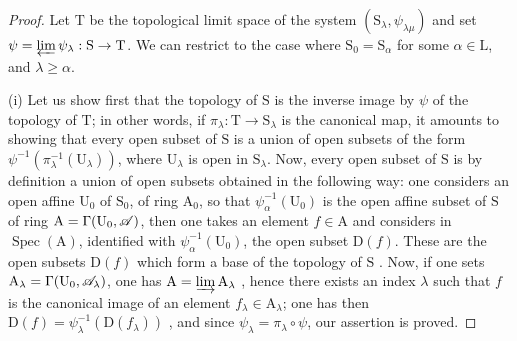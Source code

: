 \begin{proof}
Let $\mathrm{T}$ be the topological limit space of the system $(\mathrm{S}_\lambda,\psi_{\lambda\mu})$ and set $\psi=\varprojlim\psi_\lambda:\mathrm{S}\to\mathrm{T}$.
We can restrict to the case where $\mathrm{S}_0=\mathrm{S}_\alpha$ for some $\alpha\in\mathrm{L}$, and $\lambda\geqslant\alpha$.

\medskip
\noindent
(i) Let us show first that the topology of $\mathrm{S}$ is the inverse image by $\psi$ of the topology of $\mathrm{T}$; in other words, if $\pi_\lambda:\mathrm{T}\to\mathrm{S}_\lambda$ is the canonical map, it amounts to showing that every open subset of $\mathrm{S}$ is a union of open subsets of the form $\psi^{-1}(\pi_\lambda^{-1}(\mathrm{U}_\lambda))$, where $\mathrm{U}_\lambda$ is open in $\mathrm{S}_\lambda$.
Now, every open subset of $\mathrm{S}$ is by definition a union of open subsets obtained in the following way: one considers an open affine $\mathrm{U}_0$ of $\mathrm{S}_0$, of ring $\mathrm{A}_0$, so that $\psi_\alpha^{-1}(\mathrm{U}_0)$ is the open affine subset of $\mathrm{S}$ of ring $\mathrm{A}=\Gamma(\mathrm{U}_0,\mathscr{A})$, then one takes an element $f\in\mathrm{A}$ and considers in $\operatorname{Spec}(\mathrm{A})$, identified with $\psi_\alpha^{-1}(\mathrm{U}_0)$, the open subset $\mathrm{D}(f)$.
These are the open subsets $\mathrm{D}(f)$ which form a base of the topology of $\mathrm{S}$ .
Now, if one sets $\mathrm{A}_\lambda=\Gamma(\mathrm{U}_0,\mathscr{A}_\lambda)$, one has $\mathrm{A}=\varinjlim\mathrm{A}_\lambda$ , hence there exists an index $\lambda$ such that $f$ is the canonical image of an element $f_\lambda\in\mathrm{A}_\lambda$; one has then $\mathrm{D}(f)=\psi_\lambda^{-1}(\mathrm{D}(f_\lambda))$ , and since $\psi_\lambda=\pi_\lambda\circ\psi$, our assertion is proved.


\end{proof}
